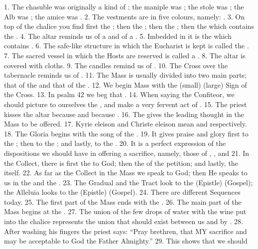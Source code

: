 \documentclass[a4paper,14pt]{memoir}
\newcommand\answer[1]{\textbf{\textit{#1}}}
\begin{document}
1. The  chasuble  was  originally  a  kind  of  \answer{};  the  maniple  was
\answer{}; the stole was \answer{};  the  Alb  was  \answer{};  the  amice  was
\answer{}. 
2. The vestments are in five colours, namely: \answer{}. 
3. On  top
of the chalice you find first the \answer{}; then  the  \answer{}  ;  then  the
\answer{}; then the \answer{} which contains the \answer{}. 
4. The altar  reminds
us of a \answer{} and of a \answer{}. 
5. Imbedded in it is the \answer{}  which
contains \answer{}. 
6. The safe-like structure  in  which  the  Eucharist  is
kept is called the \answer{}. 
7. The sacred  vessel  in  which  the  Hosts  are
reserved is called a  \answer{}.  
8.  The  altar  is  covered  with  \answer{}
cloths. 
9. The candles remind  us  of  \answer{}.  
10.  The  Cross  over  the
tabernacle reminds us of \answer{}. 
11. The Mass is usually divided into  two
main parts; that of the \answer{} and that of the \answer{}. 
12. We  begin  Mass
with the (small) (large) Sign of the Cross. 
13. In  psalm  42  we  beg  that
\answer{}. 
14. When saying the Confiteor, we should picture to ourselves  the
\answer{}, and make a very fervent act of \answer{}.  
15.  The  priest  kisses
the altar because \answer{} and because \answer{}. 
16. The \answer{} gives  the
leading thought in the Mass to be offered. 
17.  Kyrie  eleison  and  Christe
eleison mean \answer{} and \answer{} respectively. 
18. The Gloria begins  with
the song of the \answer{}. 
19.  It  gives  praise  and  glory  first  to  the
\answer{}; then to the \answer{}; and lastly, to the \answer{}.  
20.  It  is  a
perfect expression  of  the  dispositions  we  should  have  in  offering  a
sacrifice, namely, those of \answer{}, \answer{}, \answer{}  and  \answer{}  
21.
In the Collect, there is first the \answer{} to God;  then  the  \answer{}  of
the petition; and lastly, the \answer{} itself. 
22. As far as the Collect  in
the Mass we speak to God; then He speaks to  us  in  the  \answer{}  and  the
\answer{}. 
23. The Gradual and the Tract look to the (Epistle) (Gospel);  the
Alleluia looks to the (Epistle) (Gospel). 
24. There are  \answer{}  different
Sequences today. 
25. The first part of the Mass ends with the \answer{}.  
26.
The main part of the Mass begins at the \answer{}. 
27. The union of  the  few
drops of water with the wine put into the chalice represents the union  that
should exist between us and \answer{} by  \answer{}.  
28.  After  washing  his
fingers the priest says: “Pray brethren, that MY sacrifice and \answer{}  may
be acceptable to God the Father Almighty.” 
29. This  shows  that  we  should
\end{document}
